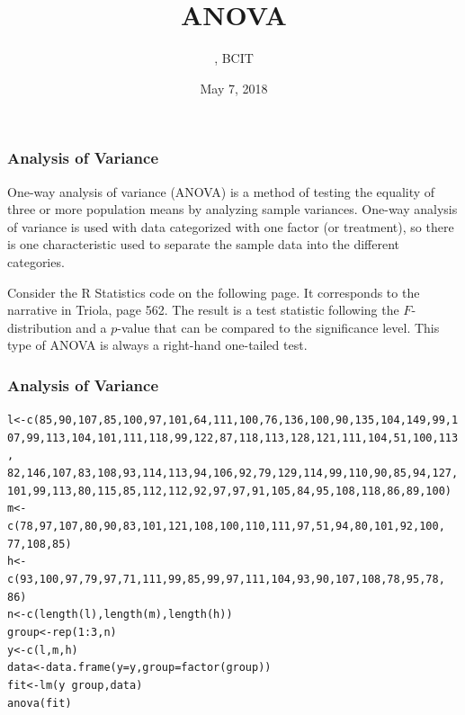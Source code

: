 \documentclass[xcolor=dvipsnames]{beamer}
\title{ANOVA}
\subtitle{{\CourseNumber}, BCIT}
\author{\CourseName}
\date{May 7, 2018}
\begin{document}
\begin{frame}
  \titlepage
\end{frame}

\begin{frame}
  \frametitle{Analysis of Variance}
One-way analysis of variance (ANOVA) is a method of testing the
equality of three or more population means by analyzing sample
variances. One-way analysis of variance is used with data categorized
with one factor (or treatment), so there is one characteristic used to
separate the sample data into the different categories.

\bigskip

Consider the R Statistics code on the following page. It corresponds
to the narrative in Triola, page 562. The result is a test statistic
following the $F$-distribution and a $p$-value that can be compared to
the significance level. This type of ANOVA is always a right-hand
one-tailed test.
\end{frame}

\begin{frame}[fragile]
  \frametitle{Analysis of Variance}
\begin{scriptsize}
\begin{alltt}
l<-c(85,90,107,85,100,97,101,64,111,100,76,136,100,90,135,104,149,99,1
  07,99,113,104,101,111,118,99,122,87,118,113,128,121,111,104,51,100,113,
  82,146,107,83,108,93,114,113,94,106,92,79,129,114,99,110,90,85,94,127,
  101,99,113,80,115,85,112,112,92,97,97,91,105,84,95,108,118,86,89,100)
m<-c(78,97,107,80,90,83,101,121,108,100,110,111,97,51,94,80,101,92,100,
  77,108,85)
h<-c(93,100,97,79,97,71,111,99,85,99,97,111,104,93,90,107,108,78,95,78,
  86)
n<-c(length(l),length(m),length(h))
group<-rep(1:3,n)
y<-c(l,m,h)
data<-data.frame(y=y,group=factor(group))
fit<-lm(y~group,data)
anova(fit)
\end{alltt}
\end{scriptsize}
\end{frame}
\end{document}
